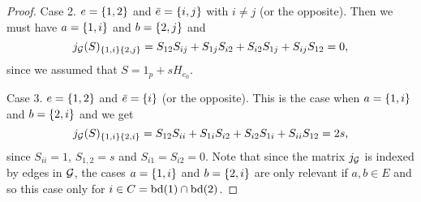 \begin{proof}
    Case 2. $e = {\left\{1, 2\right\}}$ and $\bar e = {\left\{i, j\right\}}$ with $i \neq j$ (or the opposite). Then we must have $a = {\left\{1, i\right\}}$ and $b = {\left\{2, j\right\}}$ and
    \begin{equation*}
        j_{\mathcal{G}}(S)_{{\left\{1, i\right\}} {\left\{2, j\right\}}} = S_{1 2}S_{i j} + S_{1 j} S_{i 2} + S_{i 2} S_{1 j} + S_{i j} S_{1 2} = 0,
    \end{equation*}
    since we assumed that $S = 1_p + s H_{e_0}$.

    Case 3. $e = {\left\{1, 2\right\}}$ and $\bar e = {\left\{i\right\}}$ (or the opposite). This is the case when $a = {\left\{1, i\right\}}$ and $b = {\left\{2, i\right\}}$ and we get
    \begin{equation*}
        j_{\mathcal{G}}(S)_{{\left\{1, i\right\}} {\left\{2, i\right\}}} = 
        S_{1 2}S_{i i} + S_{1 i} S_{i 2} + S_{i 2} S_{1 i} + S_{i i} S_{1 2} = 2 s,
    \end{equation*}
    since $S_{i i} = 1$, $S_{1, 2} = s$ and $S_{i 1} = S_{i 2} = 0$. Note that since the matrix $j_{\mathcal{G}}$ is indexed by edges in ${\mathcal{G}}$, the cases $a = {\left\{1, i\right\}}$ and $b = {\left\{2, i\right\}}$ are only relevant if $a, b \in E$ and so this case only for $i \in C = {\textrm{bd}}(1) \cap {\textrm{bd}}(2)$.


\end{proof}
